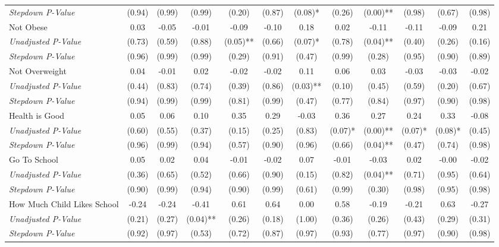 \begin{tabular}{l c c c c c c c c c c c}
\quad \textit{Stepdown P-Value} & (0.94) & (0.99) & (0.99) & (0.20) & (0.87) & (0.08)* & (0.26) & (0.00)** & (0.98) & (0.67) & (0.98) \\
Not Obese & 0.03 & -0.05 & -0.01 & -0.09 & -0.10 & 0.18 & 0.02 & -0.11 & -0.11 & -0.09 & 0.21 \\
\quad \textit{Unadjusted P-Value} & (0.73) & (0.59) & (0.88) & (0.05)** & (0.66) & (0.07)* & (0.78) & (0.04)** & (0.40) & (0.26) & (0.16) \\
\quad \textit{Stepdown P-Value} & (0.96) & (0.99) & (0.99) & (0.29) & (0.91) & (0.47) & (0.99) & (0.28) & (0.95) & (0.90) & (0.89) \\
Not Overweight & 0.04 & -0.01 & 0.02 & -0.02 & -0.02 & 0.11 & 0.06 & 0.03 & -0.03 & -0.03 & -0.02 \\
\quad \textit{Unadjusted P-Value} & (0.44) & (0.83) & (0.74) & (0.39) & (0.86) & (0.03)** & (0.10) & (0.45) & (0.59) & (0.20) & (0.67) \\
\quad \textit{Stepdown P-Value} & (0.94) & (0.99) & (0.99) & (0.81) & (0.99) & (0.47) & (0.77) & (0.84) & (0.97) & (0.90) & (0.98) \\
Health is Good & 0.05 & 0.06 & 0.10 & 0.35 & 0.29 & -0.03 & 0.36 & 0.27 & 0.24 & 0.33 & -0.08 \\
\quad \textit{Unadjusted P-Value} & (0.60) & (0.55) & (0.37) & (0.15) & (0.25) & (0.83) & (0.07)* & (0.00)** & (0.07)* & (0.08)* & (0.45) \\
\quad \textit{Stepdown P-Value} & (0.96) & (0.99) & (0.94) & (0.57) & (0.90) & (0.96) & (0.66) & (0.04)** & (0.47) & (0.74) & (0.98) \\
Go To School & 0.05 & 0.02 & 0.04 & -0.01 & -0.02 & 0.07 & -0.01 & -0.03 & 0.02 & -0.00 & -0.02 \\
\quad \textit{Unadjusted P-Value} & (0.36) & (0.65) & (0.52) & (0.66) & (0.90) & (0.15) & (0.82) & (0.04)** & (0.71) & (0.95) & (0.64) \\
\quad \textit{Stepdown P-Value} & (0.90) & (0.99) & (0.94) & (0.90) & (0.99) & (0.61) & (0.99) & (0.30) & (0.98) & (0.95) & (0.98) \\
How Much Child Likes School & -0.24 & -0.24 & -0.41 & 0.61 & 0.64 & 0.00 & 0.58 & -0.19 & -0.21 & 0.63 & -0.27 \\
\quad \textit{Unadjusted P-Value} & (0.21) & (0.27) & (0.04)** & (0.26) & (0.18) & (1.00) & (0.36) & (0.26) & (0.43) & (0.29) & (0.31) \\
\quad \textit{Stepdown P-Value} & (0.92) & (0.97) & (0.53) & (0.72) & (0.87) & (0.97) & (0.93) & (0.77) & (0.97) & (0.90) & (0.98) \\

\end{tabular}
